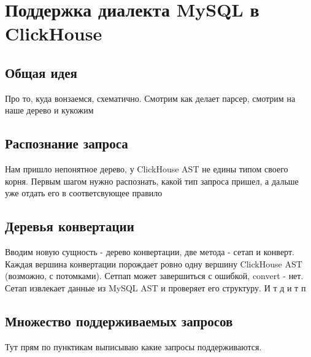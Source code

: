 \section{Поддержка диалекта MySQL в ClickHouse}
\subsection{Общая идея}
Про то, куда вонзаемся, схематично. Смотрим как делает парсер, смотрим на наше дерево и кукожим

\subsection{Распознание запроса}
Нам пришло непонятное дерево, у ClickHouse AST не едины типом своего корня. Первым шагом нужно распознать, какой тип запроса пришел, а дальше уже отдать его в соответсвующее правило

\subsection{Деревья конвертации}
Вводим новую сущность - дерево конвертации, две метода - сетап и конверт. Каждая вершина конвертации порождает ровно одну вершину ClickHouse AST (возможно, с потомками). Сетпап может завершиться с ошибкой, convert - нет. Сетап извлекает данные из MySQL AST и проверяет его структуру. И т д и т п

\subsection{Множество поддерживаемых запросов}
Тут прям по пунктикам выписываю какие запросы поддерживаются. 

\pagebreak

